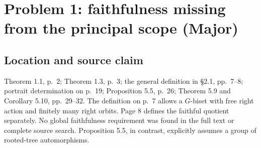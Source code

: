 \documentclass[10pt]{article}
\begin{document}
\section*{Problem 1: faithfulness missing from the principal scope (Major)}
\subsection*{Location and source claim}
Theorem 1.1, p. 2; Theorem 1.3, p. 3; the general definition in §2.1, pp. 7–8; portrait determination on p. 19; Proposition 5.5, p. 26; Theorem 5.9 and Corollary 5.10, pp. 29–32. The definition on p. 7 allows a \(G\)-biset with free right action and finitely many right orbits. Page 8 defines the faithful quotient separately. No global faithfulness requirement was found in the full text or complete source search. Proposition 5.5, in contrast, explicitly assumes a group of rooted-tree automorphisms.\par
\end{document}
